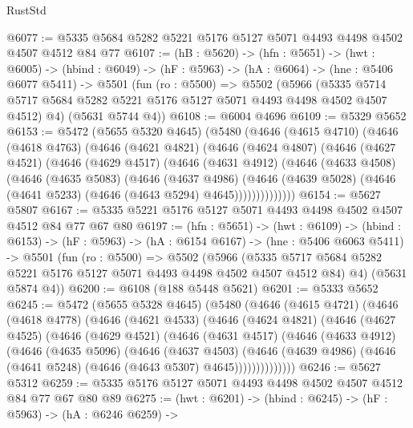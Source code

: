 \begin{lexlean}{RustStd}
\begin{coremodule}
{\begin{coremodule}
{{{{{{{{@6077 := @5335 @5684 @5282 @5221 @5176 @5127 @5071 @4493 @4498 @4502 @4507 @4512 @84 @77
@6107 := (hB : @5620) ->
  (hfn : @5651) ->
  (hwt : @6005) ->
  (hbind : @6049) ->
  (hF : @5963) ->
  (hA : @6064) ->
  (hne : @5406 @6077 @5411) ->
  @5501
    (fun (ro : @5500) =>
    @5502
      (@5966
        (@5335 @5714 @5717 @5684 @5282 @5221 @5176 @5127 @5071 @4493 @4498 @4502 @4507 @4512)
        @4)
      (@5631 @5744 @4))
@6108 := @6004 @4696
@6109 := @5329 @5652
@6153 := @5472
    (@5655 @5320 @4645)
    (@5480
      (@4646
        (@4615 @4710)
        (@4646
          (@4618 @4763)
          (@4646
            (@4621 @4821)
            (@4646
              (@4624 @4807)
              (@4646
                (@4627 @4521)
                (@4646
                  (@4629 @4517)
                  (@4646
                    (@4631 @4912)
                    (@4646
                      (@4633 @4508)
                      (@4646
                        (@4635 @5083)
                        (@4646
                          (@4637 @4986)
                          (@4646
                            (@4639 @5028)
                            (@4646 (@4641 @5233) (@4646 (@4643 @5294) @4645))))))))))))))
@6154 := @5627 @5807
@6167 := @5335 @5221 @5176 @5127 @5071 @4493 @4498 @4502 @4507 @4512 @84 @77 @67 @80
@6197 := (hfn : @5651) ->
  (hwt : @6109) ->
  (hbind : @6153) ->
  (hF : @5963) ->
  (hA : @6154 @6167) ->
  (hne : @5406 @6063 @5411) ->
  @5501
    (fun (ro : @5500) =>
    @5502
      (@5966 (@5335 @5717 @5684 @5282 @5221 @5176 @5127 @5071 @4493 @4498 @4502 @4507 @4512 @84) @4)
      (@5631 @5874 @4))
@6200 := @6108 (@188 @5448 @5621)
@6201 := @5333 @5652
@6245 := @5472
    (@5655 @5328 @4645)
    (@5480
      (@4646
        (@4615 @4721)
        (@4646
          (@4618 @4778)
          (@4646
            (@4621 @4533)
            (@4646
              (@4624 @4821)
              (@4646
                (@4627 @4525)
                (@4646
                  (@4629 @4521)
                  (@4646
                    (@4631 @4517)
                    (@4646
                      (@4633 @4912)
                      (@4646
                        (@4635 @5096)
                        (@4646
                          (@4637 @4503)
                          (@4646
                            (@4639 @4986)
                            (@4646 (@4641 @5248) (@4646 (@4643 @5307) @4645))))))))))))))
@6246 := @5627 @5312
@6259 := @5335 @5176 @5127 @5071 @4493 @4498 @4502 @4507 @4512 @84 @77 @67 @80 @89
@6275 := (hwt : @6201) ->
  (hbind : @6245) ->
  (hF : @5963) ->
  (hA : @6246 @6259) ->
}}}}}}}}
\end{coremodule}}
\end{coremodule}
\end{lexlean}
